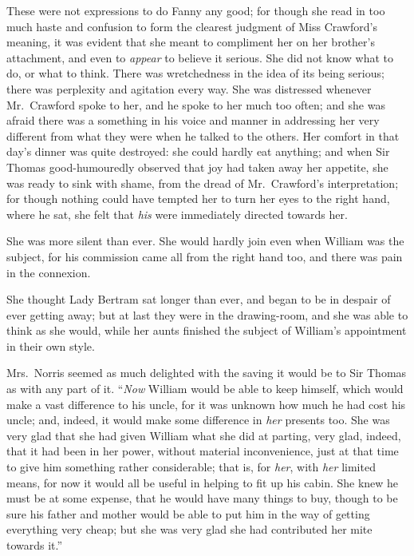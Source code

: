 These were not expressions to do Fanny any good;
for though she read in too much haste and confusion
to form the clearest judgment of Miss Crawford's meaning,
it was evident that she meant to compliment her on her
brother's attachment, and even to \emph{appear} to believe
it serious.  She did not know what to do, or what to think.
There was wretchedness in the idea of its being serious;
there was perplexity and agitation every way.
She was distressed whenever Mr.\ Crawford spoke to her,
and he spoke to her much too often; and she was afraid
there was a something in his voice and manner in addressing
her very different from what they were when he talked
to the others.  Her comfort in that day's dinner
was quite destroyed:  she could hardly eat anything;
and when Sir Thomas good-humouredly observed that joy had
taken away her appetite, she was ready to sink with shame,
from the dread of Mr.\ Crawford's interpretation;
for though nothing could have tempted her to turn her eyes
to the right hand, where he sat, she felt that \emph{his}
were immediately directed towards her.

She was more silent than ever.  She would hardly join
even when William was the subject, for his commission
came all from the right hand too, and there was pain
in the connexion.

She thought Lady Bertram sat longer than ever, and began
to be in despair of ever getting away; but at last they
were in the drawing-room, and she was able to think
as she would, while her aunts finished the subject
of William's appointment in their own style.

Mrs.\ Norris seemed as much delighted with the saving
it would be to Sir Thomas as with any part of it.
``\emph{Now} William would be able to keep himself, which would
make a vast difference to his uncle, for it was unknown
how much he had cost his uncle; and, indeed, it would make
some difference in \emph{her} presents too.  She was very glad
that she had given William what she did at parting,
very glad, indeed, that it had been in her power,
without material inconvenience, just at that time to give
him something rather considerable; that is, for \emph{her},
with \emph{her} limited means, for now it would all be useful
in helping to fit up his cabin.  She knew he must be at
some expense, that he would have many things to buy,
though to be sure his father and mother would be able
to put him in the way of getting everything very cheap;
but she was very glad she had contributed her mite
towards it.''

